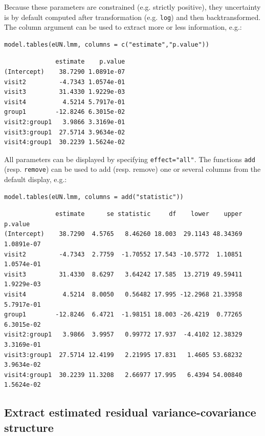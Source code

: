 \documentclass[12pt]{article}
\begin{document}
Because these parameters are constrained (e.g. strictly positive),
they uncertainty is by default computed after transformation
(e.g. \texttt{log}) and then backtransformed. The column argument can be used
to extract more or less information, e.g.:
\lstset{language=r,label= ,caption= ,captionpos=b,numbers=none}
\begin{lstlisting}
model.tables(eUN.lmm, columns = c("estimate","p.value"))
\end{lstlisting}

\begin{verbatim}
              estimate    p.value
(Intercept)    38.7290 1.0891e-07
visit2         -4.7343 1.0574e-01
visit3         31.4330 1.9229e-03
visit4          4.5214 5.7917e-01
group1        -12.8246 6.3015e-02
visit2:group1   3.9866 3.3169e-01
visit3:group1  27.5714 3.9634e-02
visit4:group1  30.2239 1.5624e-02
\end{verbatim}


All parameters can be displayed by specifying
\texttt{effect="all"}.  The functions \texttt{add} (resp. \texttt{remove})
can be used to add (resp. remove) one or several columns from the
default display, e.g.:
\lstset{language=r,label= ,caption= ,captionpos=b,numbers=none}
\begin{lstlisting}
model.tables(eUN.lmm, columns = add("statistic"))
\end{lstlisting}

\begin{verbatim}
              estimate      se statistic     df    lower    upper    p.value
(Intercept)    38.7290  4.5765   8.46260 18.003  29.1143 48.34369 1.0891e-07
visit2         -4.7343  2.7759  -1.70552 17.543 -10.5772  1.10851 1.0574e-01
visit3         31.4330  8.6297   3.64242 17.585  13.2719 49.59411 1.9229e-03
visit4          4.5214  8.0050   0.56482 17.995 -12.2968 21.33958 5.7917e-01
group1        -12.8246  6.4721  -1.98151 18.003 -26.4219  0.77265 6.3015e-02
visit2:group1   3.9866  3.9957   0.99772 17.937  -4.4102 12.38329 3.3169e-01
visit3:group1  27.5714 12.4199   2.21995 17.831   1.4605 53.68232 3.9634e-02
visit4:group1  30.2239 11.3208   2.66977 17.995   6.4394 54.00840 1.5624e-02
\end{verbatim}

\subsection{Extract estimated residual variance-covariance structure}
\label{sec:org23642bf}
\end{document}
